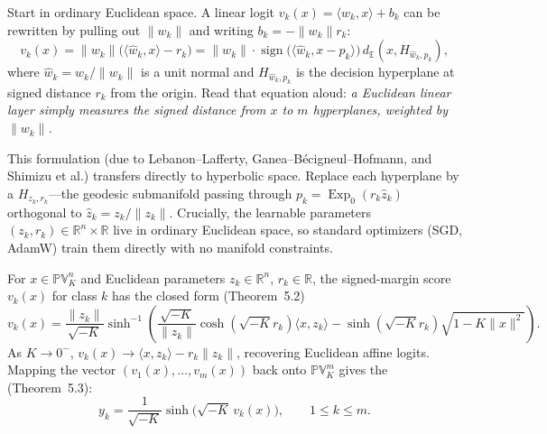 Start in ordinary Euclidean space. A linear logit \(v_k(x) = \langle w_k, x\rangle + b_k\) can be rewritten by pulling out \(\|w_k\|\) and writing \(b_k = -\|w_k\| r_k\):
\[
  v_k(x) = \|w_k\|\bigl(\langle \hat{w}_k, x\rangle - r_k\bigr)
  = \|w_k\|\cdot \operatorname{sign}\!\bigl(\langle \hat{w}_k, x - p_k\rangle\bigr)\,d_{\mathbb{E}}(x, H_{\hat{w}_k, p_k}),
\]
where \(\hat{w}_k = w_k/\|w_k\|\) is a unit normal and \(H_{\hat{w}_k, p_k}\) is the decision hyperplane at signed distance \(r_k\) from the origin. Read that equation aloud: \emph{a Euclidean linear layer simply measures the signed distance from \(x\) to \(m\) hyperplanes, weighted by \(\|w_k\|\).}

This formulation (due to Lebanon--Lafferty, Ganea--B\'ecigneul--Hofmann, and Shimizu et al.) transfers directly to hyperbolic space. Replace each hyperplane by a  \(H_{z_k,r_k}\)---the geodesic submanifold passing through \(p_k=\operatorname{Exp}_0(r_k\hat{z}_k)\) orthogonal to \(\hat{z}_k=z_k/\|z_k\|\). Crucially, the learnable parameters \((z_k,r_k)\in\mathbb{R}^n\times\mathbb{R}\) live in ordinary Euclidean space, so standard optimizers (SGD, AdamW) train them directly with no manifold constraints.

\begin{proposition}
For \(x\in\mathbb{PV}_K^n\) and Euclidean parameters \(z_k\in\mathbb{R}^n\), \(r_k\in\mathbb{R}\), the signed-margin score \(v_k(x)\) for class \(k\) has the closed form (Theorem~5.2)
\begin{equation}
  v_k(x) = \frac{\|z_k\|}{\sqrt{-K}}\sinh^{-1}\!\left(\frac{\sqrt{-K}}{\|z_k\|}\cosh(\sqrt{-K}r_k)\langle x,z_k\rangle - \sinh(\sqrt{-K}r_k)\sqrt{1-K\|x\|^2}\right).
  \label{eq:N20261121-pvmlr}
\end{equation}
As \(K\to 0^-\), \(v_k(x)\to \langle x,z_k\rangle - r_k\|z_k\|\), recovering Euclidean affine logits. Mapping the vector \((v_1(x),\ldots,v_m(x))\) back onto \(\mathbb{PV}_K^m\) gives the  (Theorem~5.3):
\begin{equation}
  y_k = \frac{1}{\sqrt{-K}}\sinh\!\bigl(\sqrt{-K}\,v_k(x)\bigr),
  \qquad 1\leq k\leq m.
  \label{eq:N20261121-pvfc}
\end{equation}
\end{proposition}

